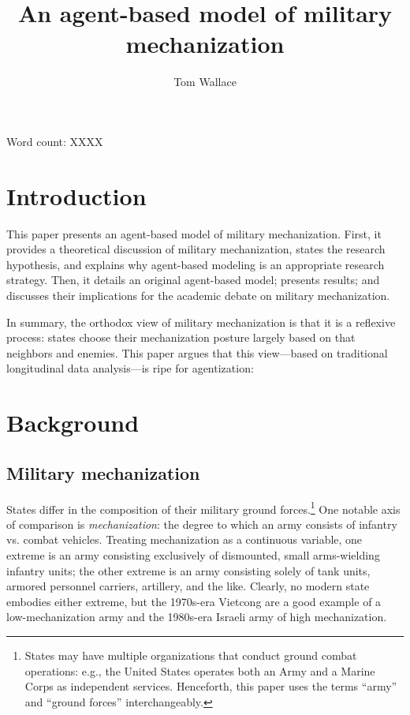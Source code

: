 \documentclass{article}
\title{An agent-based model of military mechanization}
\author{Tom Wallace}
\begin{document}
\maketitle

\begin{centering}
	Word count: XXXX
\end{centering}
\section{Introduction}

This paper presents an agent-based model of military mechanization. First, it
provides a theoretical discussion of military mechanization, states the research
hypothesis, and explains why agent-based modeling is an appropriate research strategy.
Then, it details an original agent-based model; presents results; and discusses
their implications for the academic debate on military mechanization.

In summary, the orthodox view of military mechanization is that it is a
reflexive process: states choose their mechanization posture largely based on
that neighbors and enemies. This paper argues
that this view---based on traditional longitudinal data analysis---is ripe for
agentization: 

\section{Background}

\subsection{Military mechanization}

States differ in the composition of their military ground forces.\footnote{States may have multiple organizations that
conduct ground combat operations: e.g., the United States operates both an Army
and a Marine Corps as independent services. Henceforth, this paper uses the
terms ``army'' and ``ground forces'' interchangeably.} One notable axis of comparison 
is \textit{mechanization}: the degree to which an army consists of infantry 
vs. combat vehicles. Treating mechanization as a continuous variable, 
one extreme is an army consisting exclusively of dismounted, small 
arms-wielding infantry units; the other extreme is an army consisting 
solely of tank units, armored personnel carriers, artillery, and the like.
Clearly, no modern state embodies either extreme, but the 1970s-era Vietcong are
a good example of a low-mechanization army and the 1980s-era Israeli army of
high mechanization.
\end{document}
